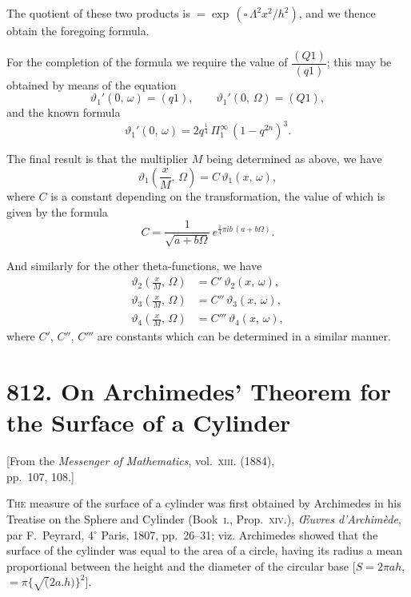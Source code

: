 \documentclass[11pt,a4paper]{book}
\begin{document}
The quotient of these two products is $= \exp\,(\square\,\Lambda^2 x^2/h^2)$, and we thence obtain the foregoing formula.

For the completion of the formula we require the value of $\dfrac{(Q1)}{(q1)}$; this may be obtained by means of the equation
\[
\vartheta_1'(0,\,\omega) = (q1),\qquad \vartheta_1'(0,\,\Omega) = (Q1),
\]
and the known formula
\[
\vartheta_1'(0,\,\omega) = 2q^{\frac{1}{4}}\,\Pi_1^{\infty}\,(1-q^{2n})^3.
\]

The final result is that the multiplier $M$ being determined as above, we have
\[
\vartheta_1\left(\frac{x}{M},\,\Omega\right) = C\,\vartheta_1(x,\,\omega),
\]
where $C$ is a constant depending on the transformation, the value of which is given by the formula
\[
C = \frac{1}{\sqrt{a+b\Omega}}\,e^{\frac{1}{4}\pi i b\,(a+b\Omega)}.
\]

And similarly for the other theta-functions, we have
\begin{align*}
\vartheta_2\left(\frac{x}{M},\,\Omega\right) &= C'\,\vartheta_2(x,\,\omega),\\
\vartheta_3\left(\frac{x}{M},\,\Omega\right) &= C''\,\vartheta_3(x,\,\omega),\\
\vartheta_4\left(\frac{x}{M},\,\Omega\right) &= C'''\,\vartheta_4(x,\,\omega),
\end{align*}
where $C'$, $C''$, $C'''$ are constants which can be determined in a similar manner.


\newpage
\section*{812. On Archimedes' Theorem for the Surface of a Cylinder}

\begin{center}
\small[From the \textit{Messenger of Mathematics}, vol.~\textsc{xiii}. (1884),\\
pp.~107, 108.]
\end{center}

\bigskip

\noindent
\textsc{The} measure of the surface of a cylinder was first obtained by Archimedes in his Treatise on the Sphere and Cylinder (Book~\textsc{i.}, Prop.~\textsc{xiv.}), \textit{\OE uvres d'Archim\`{e}de}, par F.~Peyrard, 4$^{\circ}$ Paris, 1807, pp.~26--31; viz. Archimedes showed that the surface of the cylinder was equal to the area of a circle, having its radius a mean proportional between the height and the diameter of the circular base [$S = 2\pi ah$, $= \pi\{\surd(2a.h)\}^2$].
\end{document}
